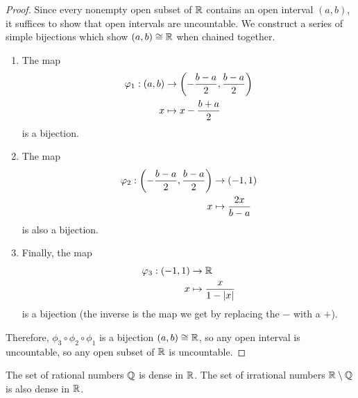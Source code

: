 \begin{proof}
	Since every nonempty open subset of $\mathbb{R}$ contains an open interval $(a,b)$, it suffices to show that open intervals are uncountable. We construct a series of simple bijections which show $(a,b) \cong \mathbb{R}$ when chained together.
	\begin{enumerate}
		\item The map
		\begin{align*}
			\varphi_1 : (a, b) &\to \qty(-\frac{b-a}{2}, \frac{b-a}{2})\\
					      x &\mapsto x - \frac{b+a}{2}
		\end{align*}
		is a bijection.
		\item The map
		\begin{align*}
			\varphi_2 : \qty(-\frac{b-a}{2}, \frac{b-a}{2}) &\to (-1,1)\\
			x &\mapsto \frac{2x}{b-a}
		\end{align*}
		is also a bijection.
		\item Finally, the map
		\begin{align*}
			\varphi_3 : (-1,1) &\to \mathbb{R}\\
			x &\mapsto \frac{x}{1 - \abs{x}}
		\end{align*}
		is a bijection (the inverse is the map we get by replacing the $-$ with a $+$).
	\end{enumerate}
	Therefore, $\phi_3 \circ \phi_2 \circ \phi_1$ is a bijection $(a,b) \cong \mathbb{R}$, so any open interval is uncountable, so any open subset of $\mathbb{R}$ is uncountable.
\end{proof}
\begin{importanttheorem}{}{}
	The set of rational numbers $\mathbb{Q}$ is dense in $\mathbb{R}$. The set of irrational numbers $\mathbb{R} \setminus \mathbb{Q}$ is also dense in $\mathbb{R}$.
\end{importanttheorem}
